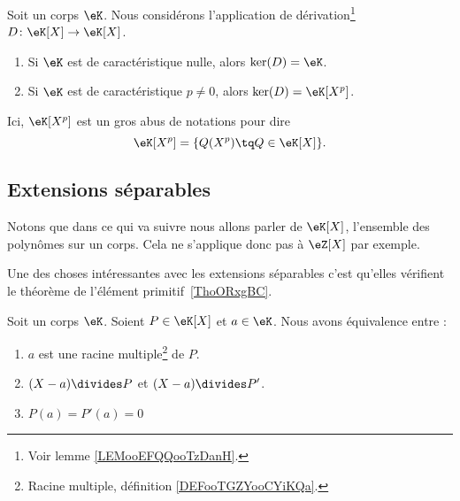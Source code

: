 \begin{lemma}     \label{LEMooFNFYooAfIPRT}
    Soit un corps \( \eK\). Nous considérons l'application de dérivation\footnote{Voir lemme \ref{LEMooEFQQooTzDanH}.} \( D\colon \eK[X]\to \eK[X]\).
    \begin{enumerate}
        \item
            Si \( \eK\) est de caractéristique nulle, alors \( \ker(D)=\eK\).
        \item
            Si \( \eK\) est de caractéristique \( p\neq 0\), alors \( \ker(D)=\eK[X^p]\).
    \end{enumerate}
    Ici, \( \eK[X^p]\) est un gros abus de notations pour dire
    \begin{equation}
        \eK[X^p]=\{ Q(X^p)\tq Q\in \eK[X] \}.
    \end{equation}
\end{lemma}

\subsection{Extensions séparables}

Notons que dans ce qui va suivre nous allons parler de \( \eK[X]\), l'ensemble des polynômes sur un corps. Cela ne s'applique donc pas à \( \eZ[X]\) par exemple.

Une des choses intéressantes avec les extensions séparables c'est qu'elles vérifient le théorème de l'élément primitif~\ref{ThoORxgBC}.

\begin{lemma}     \label{LEMooGUUJooDSrQFU}
    Soit un corps \( \eK\). Soient \( P\in \eK[X]\) et \( a\in \eK\). Nous avons équivalence entre :
    \begin{enumerate}
        \item       \label{ITEMooHMMMooWKzSLA}
            \( a\) est une racine multiple\footnote{Racine multiple, définition \ref{DEFooTGZYooCYiKQa}.} de \( P\).
        \item       \label{ITEMooZXCTooPctrMm}
            \( (X-a)\divides P\) et \( (X-a)\divides P'\).
        \item       \label{ITEMooBMSSooNOYfKn}
            \( P(a)=P'(a)=0\)
    \end{enumerate}
\end{lemma}

